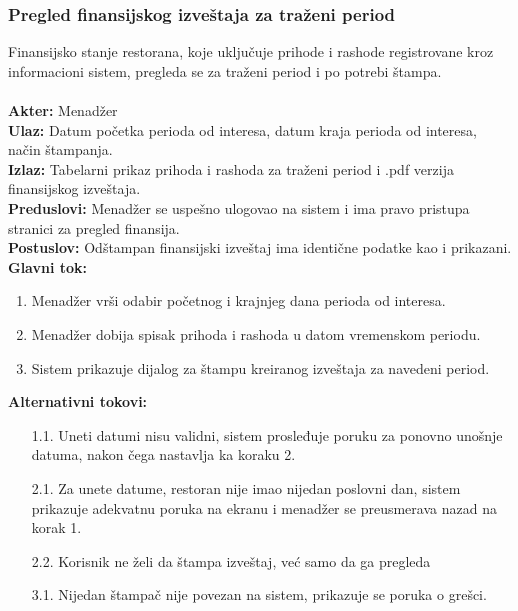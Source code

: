 \documentclass{article}
\begin{document}
\subsubsection{Pregled finansijskog izveštaja za traženi period}
Finansijsko stanje restorana, koje uključuje prihode i rashode registrovane kroz informacioni sistem, pregleda se za traženi period i po potrebi štampa.\\\\
\textbf{Akter:} Menadžer\\
\textbf{Ulaz:} Datum početka perioda od interesa, datum kraja perioda od interesa, način štampanja.\\
\textbf{Izlaz:} Tabelarni prikaz prihoda i rashoda za traženi period i .pdf verzija finansijskog izveštaja.\\
\textbf{Preduslovi:} Menadžer se uspešno ulogovao na sistem i  ima pravo pristupa stranici za pregled finansija.\\
\textbf{Postuslov:} Odštampan finansijski izveštaj ima identične podatke kao i prikazani.\\
\textbf{Glavni tok:}
\begin{enumerate}
\item Menadžer vrši odabir početnog i krajnjeg dana perioda od interesa.
\item Menadžer dobija spisak prihoda i rashoda u datom vremenskom periodu.
\item Sistem prikazuje dijalog za štampu kreiranog izveštaja za navedeni period.
\end{enumerate}
\textbf{Alternativni tokovi:}\\
\begin{itemize}
\item [1.1.] Uneti datumi nisu validni, sistem prosleđuje poruku za ponovno unošnje datuma, nakon čega nastavlja ka koraku 2.
\item [2.1.] Za unete datume, restoran nije imao nijedan poslovni dan, sistem prikazuje adekvatnu poruka na ekranu i menadžer se preusmerava nazad na korak 1.
\item [2.2.] Korisnik ne želi da štampa izveštaj, već samo da ga pregleda
\item [3.1.] Nijedan štampač nije povezan na sistem, prikazuje se poruka o grešci.
\end{itemize}
       
\end{document}
